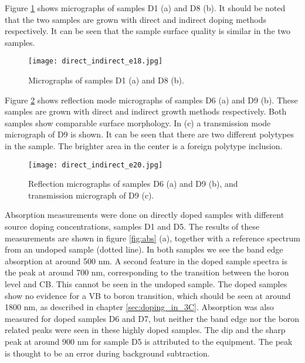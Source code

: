 Figure \ref{fig:B_doped_micrographs2} shows micrographs of samples D1 (a) and D8 (b). It should be noted that the two samples are grown with direct and indirect doping methods respectively. It can be seen that the sample surface quality is similar in the two samples. 

\begin{figure}[h]
\begin{center}
\texttt{[image: direct\_indirect\_e18.jpg]}
\caption{Micrographs of samples D1 (a) and D8 (b). 
\label{fig:B_doped_micrographs2}}
\end{center}
\end{figure}


Figure \ref{fig:BGe20_micrograph} shows reflection mode micrographs of samples D6 (a) and D9 (b). These samples are grown with direct and indirect growth methods respectively. Both samples show comparable surface morphology. In (c) a transmission mode micrograph of D9 is shown. It can be seen that there are two different polytypes in the sample. The brighter area in the center is a foreign polytype inclusion. 

\begin{figure}[h]
\begin{center}
\texttt{[image: direct\_indirect\_e20.jpg]}
\caption{Reflection micrographs of samples D6 (a) and D9 (b), and transmission micrograph of D9 (c). 
\label{fig:BGe20_micrograph}}
\end{center}
\end{figure}



Absorption measurements were done on directly doped samples with different source doping concentrations, samples D1 and D5. The results of these measurements are shown in figure \ref{fig:abs} (a), together with a reference spectrum from an undoped sample (dotted line). In both samples we see the band edge absorption at around 500 nm. A second feature in the doped sample spectra is the peak at around 700 nm, corresponding to the transition between the boron level and CB. This cannot be seen in the undoped sample. The doped samples show no evidence for a VB to boron transition, which should be seen at around 1800 nm, as described in chapter \ref{sec:doping_in_3C}. Absorption was also measured for doped samples D6 and D7, but neither the band edge nor the boron related peaks were seen in these highly doped samples. The dip and the sharp peak at around 900 nm for sample D5 is attributed to  the equipment. The peak is thought to be an error during background subtraction. 

